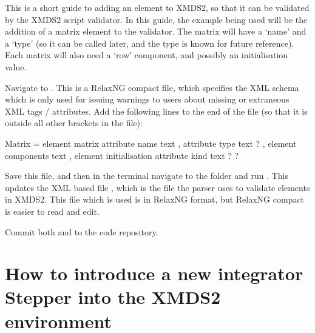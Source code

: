 \documentclass[letterpaper,10pt,english]{sphinxmanual}
\begin{document}
\sphinxAtStartPar
This is a short guide to adding an element to XMDS2, so that it can be validated by the XMDS2 script validator. In this guide, the example being used will be the addition of a matrix element to the validator.  The matrix will have a  ‘name’ and a ‘type’ (so it can be called later, and the type is known for future reference). Each matrix will also need a ‘row’ component, and possibly an initialisation value.

\sphinxAtStartPar
Navigate to . This is a RelaxNG compact file, which specifies the XML schema which is only used for issuing warnings to users about missing or extraneous XML tags / attributes. Add the following lines to the end of the file (so that it is outside all other brackets in the file):

\begin{sphinxVerbatim}[commandchars=\\\{\}]
Matrix = element matrix \PYGZob{}
    attribute name \PYGZob{} text \PYGZcb{}
    , attribute type \PYGZob{} text \PYGZcb{}?
    , element components \PYGZob{} text \PYGZcb{}
    , element initialisation \PYGZob{}
        attribute kind \PYGZob{} text \PYGZcb{}?
    \PYGZcb{}?
\PYGZcb{}
\end{sphinxVerbatim}

\sphinxAtStartPar
Save this file, and then in the terminal navigate to the folder  and run . This updates the XML based file , which is the file the parser uses to validate elements in XMDS2. This file which is  used is in RelaxNG format, but RelaxNG compact is easier to read and edit.

\sphinxAtStartPar
Commit both  and  to the code repository.

\ignorespaces 

\section{How to introduce a new integrator Stepper into the XMDS2 environment}
\label{\detokenize{developer:how-to-introduce-a-new-integrator-stepper-into-the-xmds2-environment}}\label{\detokenize{developer:howtoaddintegrator}}\label{\detokenize{developer:index-4}}
\end{document}
